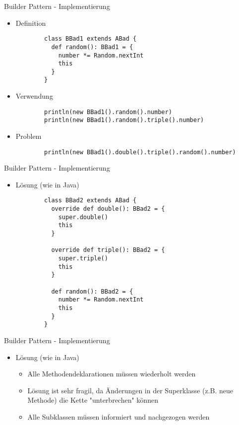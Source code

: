 
\begin{frame}[fragile]{Builder Pattern - Implementierung}
\begin{itemize}
	\item Definition
		\begin{lstlisting}
		class BBad1 extends ABad {
		  def random(): BBad1 = {
		    number *= Random.nextInt
		    this
		  }
		}
		\end{lstlisting}
	\item Verwendung
		\begin{lstlisting}
		println(new BBad1().random().number)
		println(new BBad1().random().triple().number)
		\end{lstlisting}
	\item Problem
		\begin{lstlisting}
		println(new BBad1().double().triple().random().number)
		\end{lstlisting}
\end{itemize}
\end{frame}


\begin{frame}[fragile]{Builder Pattern - Implementierung}
\begin{itemize}
	\item Lösung (wie in Java)
		\begin{lstlisting}
		class BBad2 extends ABad {
		  override def double(): BBad2 = {
		    super.double()
		    this
		  }

		  override def triple(): BBad2 = {
		    super.triple()
		    this
		  }

		  def random(): BBad2 = {
		    number *= Random.nextInt
		    this
		  }
		}
		\end{lstlisting}
\end{itemize}
\end{frame}


\begin{frame}[fragile]{Builder Pattern - Implementierung}
\begin{itemize}
	\item Lösung (wie in Java)
		\begin{itemize}
			\item Alle Methodendeklarationen müssen wiederholt werden
			\item Lösung ist sehr fragil, da Änderungen in der Superklasse (z.B. neue Methode) die Kette "unterbrechen" können
			\item Alle Subklassen müssen informiert und nachgezogen werden
		\end{itemize}
\end{itemize}
\end{frame}

